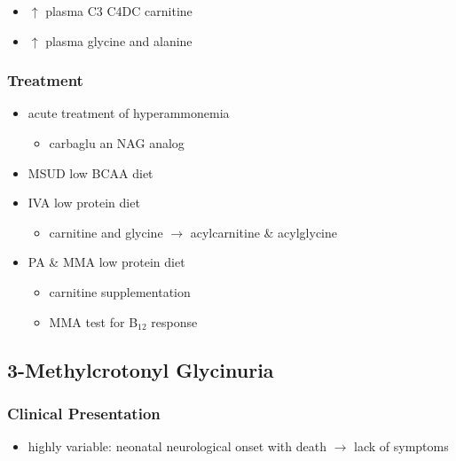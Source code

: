 \documentclass{scrartcl}
\begin{document}
\begin{enumerate}
\begin{itemize}
\item \(\uparrow\) plasma C3 \textpm{} C4DC carnitine
\item \(\uparrow\) plasma glycine and alanine
\end{itemize}
\end{enumerate}

\subsubsection{Treatment}
\label{sec:orga40d1ad}
\begin{itemize}
\item acute treatment of hyperammonemia
\begin{itemize}
\item carbaglu an NAG analog
\end{itemize}
\item MSUD low BCAA diet
\item IVA low protein diet
\begin{itemize}
\item carnitine and glycine \(\to\) acylcarnitine \& acylglycine
\end{itemize}
\item PA \& MMA low protein diet
\begin{itemize}
\item carnitine supplementation
\item MMA test for B\(_{\text{12}}\) response
\end{itemize}
\end{itemize}

\subsection{3-Methylcrotonyl Glycinuria}
\label{sec:org95e0340}
\subsubsection{Clinical Presentation}
\label{sec:orgc822d83}
\begin{itemize}
\item highly variable: neonatal neurological onset with death \(\to\) lack of symptoms
\end{itemize}
\end{document}
